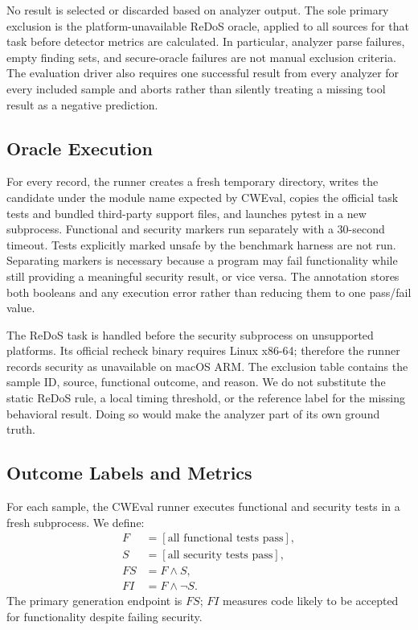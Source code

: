\documentclass[sigconf,nonacm]{acmart}
\begin{document}
No result is selected or discarded based on analyzer output. The sole primary
exclusion is the platform-unavailable ReDoS oracle, applied to all sources for
that task before detector metrics are calculated. In particular, analyzer
parse failures, empty finding sets, and secure-oracle failures are not manual
exclusion criteria. The evaluation driver also requires one successful result
from every analyzer for every included sample and aborts rather than silently
treating a missing tool result as a negative prediction.

\subsection{Oracle Execution}

For every record, the runner creates a fresh temporary directory, writes the
candidate under the module name expected by CWEval, copies the official task
tests and bundled third-party support files, and launches pytest in a new
subprocess. Functional and security markers run separately with a 30-second
timeout. Tests explicitly marked unsafe by the benchmark harness are not run.
Separating markers is necessary because a program may fail functionality while
still providing a meaningful security result, or vice versa. The annotation
stores both booleans and any execution error rather than reducing them to one
pass/fail value.

The ReDoS task is handled before the security subprocess on unsupported
platforms. Its official recheck binary requires Linux x86-64; therefore the
runner records security as unavailable on macOS ARM. The exclusion table
contains the sample ID, source, functional outcome, and reason. We do not
substitute the static ReDoS rule, a local timing threshold, or the reference
label for the missing behavioral result. Doing so would make the analyzer part
of its own ground truth.

\subsection{Outcome Labels and Metrics}

For each sample, the CWEval runner executes functional and security tests in a
fresh subprocess. We define:
\begin{align*}
F &= [\text{all functional tests pass}],\\
S &= [\text{all security tests pass}],\\
FS &= F \land S,\\
FI &= F \land \neg S.
\end{align*}
The primary generation endpoint is $FS$; $FI$ measures code likely to be
accepted for functionality despite failing security.
\end{document}
